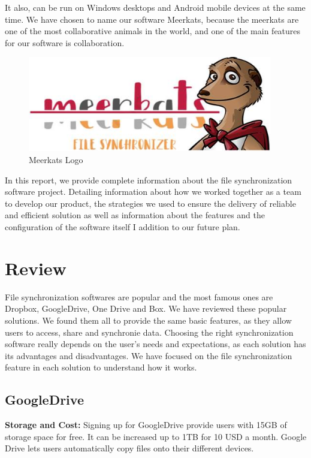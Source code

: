 \documentclass{article}
\begin{document}
It also, can be run on Windows desktops and Android mobile devices at the same time. We have chosen to name our software Meerkats, because the meerkats are one of the most collaborative animals in the world, and one of the main features for our software is collaboration.

\begin{figure}[h]
    \centering
    \includegraphics[width=0.95\textwidth]{logo}
    \caption{Meerkats Logo}
    \label{fig:logo1}
\end{figure}

In this report, we provide complete information about the file synchronization software project. Detailing information about how we worked together as a team to develop our product, the strategies we used to ensure the delivery of reliable and efficient solution as well as information about the features and the configuration of the software itself I addition to our future plan.


\section{Review}
File synchronization softwares are popular and the most famous ones are Dropbox, GoogleDrive, One Drive and Box. We have reviewed these popular solutions. We found them all to provide the same basic features, as they allow users to access, share and synchronie data. Choosing the right synchronization software really depends on the user’s needs and expectations, as each solution has its advantages and disadvantages. We have focused on the file synchronization feature in each solution to understand how it works.

\subsection{GoogleDrive}
\textbf{Storage and Cost:}
Signing up for GoogleDrive provide users with 15GB of storage space for free. It can be increased up to 1TB for 10 USD a month. Google Drive lets users automatically copy files onto their different devices.
\end{document}

